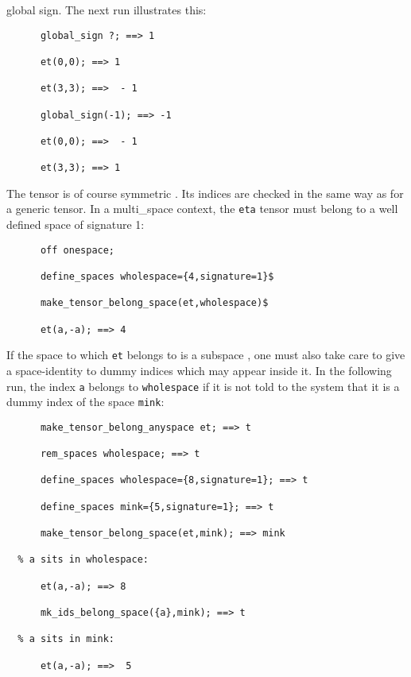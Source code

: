 global sign. The next run illustrates this:
\begin{verbatim}
      global_sign ?; ==> 1

      et(0,0); ==> 1

      et(3,3); ==>  - 1

      global_sign(-1); ==> -1

      et(0,0); ==>  - 1

      et(3,3); ==> 1
\end{verbatim}
The tensor is of course symmetric .
Its indices are checked in the same way as for a generic tensor.
In a multi\_space context, the \texttt{eta} tensor must belong
to a well defined space of 
signature 1:
\begin{verbatim}
      off onespace;

      define_spaces wholespace={4,signature=1}$

      make_tensor_belong_space(et,wholespace)$

      et(a,-a); ==> 4
\end{verbatim}
If the space to which \texttt{et} belongs to is a subspace%
,
one must also
take care to give a space-identity to dummy indices which may appear inside
it. In the following run, the index \texttt{a} belongs to \texttt{wholespace}
if it is not told to the system that it is a dummy
index of the space \texttt{mink}:
\begin{verbatim}
      make_tensor_belong_anyspace et; ==> t

      rem_spaces wholespace; ==> t

      define_spaces wholespace={8,signature=1}; ==> t

      define_spaces mink={5,signature=1}; ==> t

      make_tensor_belong_space(et,mink); ==> mink

  % a sits in wholespace:

      et(a,-a); ==> 8

      mk_ids_belong_space({a},mink); ==> t

  % a sits in mink:

      et(a,-a); ==>  5
\end{verbatim}

